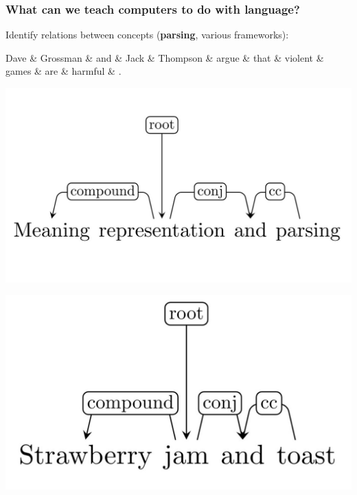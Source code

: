 \documentclass[t,xcolor={svgnames,table}]{beamer}
\begin{document}
\begin{frame}
\frametitle{What can we teach computers to do with language?}
    Identify relations between concepts (\textbf{parsing}, various frameworks):

    \begin{adjustbox}{center}
    \begin{dependency}[line width=2pt,label style={line width=.5pt,draw=black}]
    \begin{deptext}
        Dave  \& Grossman \& and   \& Jack  \& Thompson \& argue \& that  \& violent \& games \& are \& harmful \& .     \\
	\end{deptext}
    \end{dependency}
    \end{adjustbox}
\end{frame}

\begin{frame}
\includegraphics[width=\textwidth]{dep_meaning}
\end{frame}

\begin{frame}
\includegraphics[width=\textwidth]{dep_toast}
\end{frame}
\end{document}
